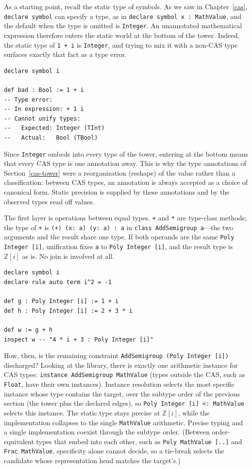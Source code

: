 As a starting point, recall the static type of symbols.
As we saw in Chapter~\ref{cas}, \lstinline{declare symbol} can specify a type, as in \lstinline{declare symbol x : MathValue}, and the default when the type is omitted is \lstinline{Integer}.
An unannotated mathematical expression therefore enters the static world at the bottom of the tower.
Indeed, the static type of \lstinline{1 + i} is \lstinline{Integer}, and trying to mix it with a non-CAS type surfaces exactly that fact as a type error.
\begin{lstlisting}[language=egison,numbers=none]
declare symbol i

def bad : Bool := 1 + i
-- Type error:
-- In expression: + 1 i
-- Cannot unify types:
--   Expected: Integer (TInt)
--   Actual:   Bool (TBool)
\end{lstlisting}
Since \lstinline{Integer} embeds into every type of the tower, entering at the bottom means that every CAS type is one annotation away.
This is why the type annotations of Section~\ref{cas-tower} were a reorganization (reshape) of the value rather than a classification: between CAS types, an annotation is always accepted as a choice of canonical form.
Static precision is supplied by these annotations and by the observed types read off values.

The first layer is operations between equal types.
\lstinline{+} and \lstinline{*} are type-class methods; the type of \lstinline{+} is \lstinline{(+) (x: a) (y: a) : a} in \lstinline{class AddSemigroup a}---the two arguments and the result share one type.
If both operands are the same \lstinline{Poly Integer [i]}, unification fixes \lstinline{a} to \lstinline{Poly Integer [i]}, and the result type is $\mathbb{Z}[i]$ as is.
No join is involved at all.
\begin{lstlisting}[language=egison,numbers=none]
declare symbol i
declare rule auto term i^2 = -1

def g : Poly Integer [i] := 1 + i
def h : Poly Integer [i] := 2 + 3 * i

def w := g + h
inspect w -- "4 * i + 3 : Poly Integer [i]"
\end{lstlisting}
How, then, is the remaining constraint \lstinline{AddSemigroup (Poly Integer [i])} discharged?
Looking at the library, there is exactly one arithmetic instance for CAS types: \lstinline{instance AddSemigroup MathValue} (types outside the CAS, such as \lstinline{Float}, have their own instances).
Instance resolution selects the most specific instance whose type contains the target, over the subtype order of the previous section (the tower plus the declared edges), so \lstinline{Poly Integer [i] <: MathValue} selects this instance.
The static type stays precise at $\mathbb{Z}[i]$, while the implementation collapses to the single \lstinline{MathValue} arithmetic.
Precise typing and a single implementation coexist through the subtype order.
(Between order-equivalent types that embed into each other, such as \lstinline{Poly MathValue [..]} and \lstinline{Frac MathValue}, specificity alone cannot decide, so a tie-break selects the candidate whose representation head matches the target's.)

